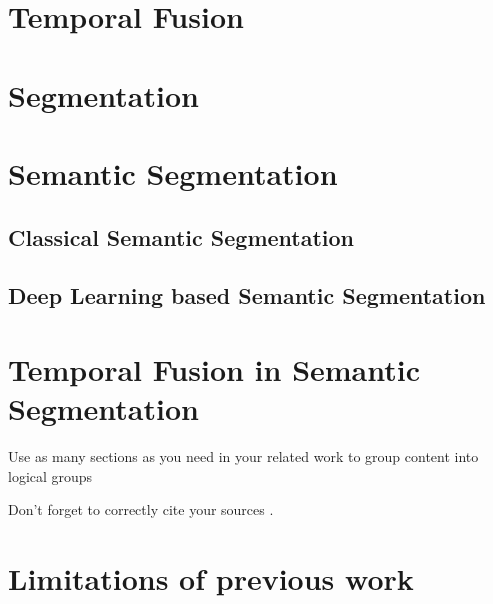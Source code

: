     \section{Temporal Fusion}
    \label{sec:tempfuse}
    \section{Segmentation}
    \section{Semantic Segmentation}
    \label{sec:semseg}
    \subsection{Classical Semantic Segmentation}
    \subsection{Deep Learning based  Semantic Segmentation}
    \section{Temporal Fusion in Semantic Segmentation}
    Use as many sections as you need in your related work to group content into logical groups

    Don't forget to correctly cite your sources \cite{art1}.
    \section{Limitations of previous work}


